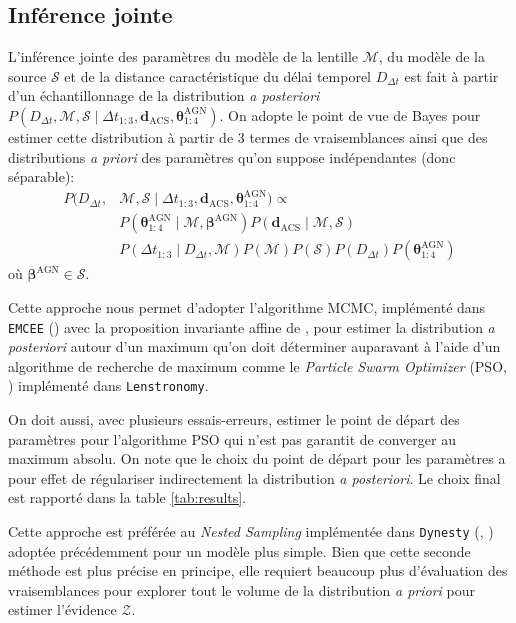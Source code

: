 \documentclass[times,10pt,twocolumn]{article}
\begin{document}
\subsection{Inférence jointe}
L'inférence jointe des paramètres du modèle de la lentille $\mathcal{M}$, 
du modèle de la source $\mathcal{S}$ et de la distance caractéristique 
du délai temporel $D_{\Delta t}$ est fait à partir d'un échantillonnage 
de la distribution \textit{a posteriori} 
$P(D_{\Delta t}, \mathcal{M}, \mathcal{S} \mid \Delta t_{1:3}, 
\boldsymbol{d}_{\mathrm{ACS}}, \boldsymbol{\theta}^{\mathrm{AGN}}_{1:4})$. 
On adopte le point de vue de Bayes pour estimer cette distribution 
à partir de 3 termes de vraisemblances ainsi que des distributions 
\textit{a priori} des paramètres 
qu'on suppose indépendantes (donc séparable):
\begin{align}\label{eq:Bayes} 
        \nonumber
        P(D_{\Delta t}, &\mathcal{M}, \mathcal{S} \mid 
\Delta t_{1:3}, 
\boldsymbol{d}_{\mathrm{ACS}}, \boldsymbol{\theta}^{\mathrm{AGN}}_{1:4}) \propto \\ 
\nonumber
&P(\boldsymbol{\theta}^{\mathrm{AGN}}_{1:4} \mid \mathcal{M}, \boldsymbol{\beta}^{\mathrm{AGN}})
P(\mathbf{d}_{\mathrm{ACS}} \mid \mathcal{M}, \mathcal{S}) \\
&P(\Delta t_{1:3} \mid D_{\Delta t}, \mathcal{M})P(\mathcal{M})P(\mathcal{S})P(D_{\Delta t})
P(\boldsymbol{\theta}^{\mathrm{AGN}}_{1:4})
\end{align}
où $\boldsymbol{\beta}^{\mathrm{AGN}} \in \mathcal{S}$. 

Cette approche nous permet d'adopter l'algorithme MCMC,
implémenté dans \texttt{EMCEE} 
(\citet{Foreman-Mackey2013}) avec la proposition invariante affine 
de \citet{Goodman2010}, pour estimer la distribution 
\textit{a posteriori} autour d'un maximum qu'on doit
déterminer auparavant à l'aide d'un algorithme de recherche de maximum 
comme le \textit{Particle Swarm Optimizer} (PSO, \citet{Eberhart1995}) 
implémenté dans 
\texttt{Lenstronomy}. 

On doit aussi, avec plusieurs essais-erreurs, 
estimer le point 
de départ des paramètres pour l'algorithme PSO qui n'est pas garantit 
de converger au maximum absolu. 
On note que le choix du point de départ 
pour les paramètres a pour 
effet de régulariser indirectement 
la distribution \textit{a posteriori}. Le choix final est 
rapporté dans la table \ref{tab:results}.

Cette approche est préférée au \textit{Nested Sampling} implémentée 
dans \texttt{Dynesty} (\citet{Skilling2006}, \citet{Higson2017}) adoptée 
précédemment pour un modèle plus simple. Bien que cette seconde méthode est 
plus précise en principe, 
elle requiert beaucoup plus d'évaluation des vraisemblances pour 
explorer tout le volume de la distribution \textit{a priori} pour estimer 
l'évidence $\mathcal{Z}$. 
\end{document}
